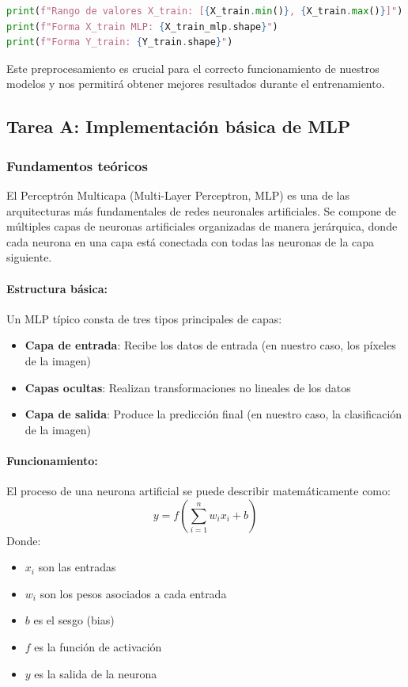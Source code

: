 \documentclass[11pt,a4paper]{article}
\begin{document}
\begin{lstlisting}[language=Python]
print(f"Rango de valores X_train: [{X_train.min()}, {X_train.max()}]")
print(f"Forma X_train MLP: {X_train_mlp.shape}")
print(f"Forma Y_train: {Y_train.shape}")
\end{lstlisting}

Este preprocesamiento es crucial para el correcto funcionamiento de nuestros modelos y nos permitirá obtener mejores resultados durante el entrenamiento.

\subsection{Tarea A: Implementación básica de MLP}

\subsubsection{Fundamentos teóricos}

El Perceptrón Multicapa (Multi-Layer Perceptron, MLP) es una de las arquitecturas más fundamentales de redes neuronales artificiales. Se compone de múltiples capas de neuronas artificiales organizadas de manera jerárquica, donde cada neurona en una capa está conectada con todas las neuronas de la capa siguiente.

\paragraph{Estructura básica:}
Un MLP típico consta de tres tipos principales de capas:
\begin{itemize}
    \item \textbf{Capa de entrada}: Recibe los datos de entrada (en nuestro caso, los píxeles de la imagen)
    \item \textbf{Capas ocultas}: Realizan transformaciones no lineales de los datos
    \item \textbf{Capa de salida}: Produce la predicción final (en nuestro caso, la clasificación de la imagen)
\end{itemize}

\paragraph{Funcionamiento:}
El proceso de una neurona artificial se puede describir matemáticamente como:
\[ y = f(\sum_{i=1}^{n} w_i x_i + b) \]
Donde:
\begin{itemize}
    \item $x_i$ son las entradas
    \item $w_i$ son los pesos asociados a cada entrada
    \item $b$ es el sesgo (bias)
    \item $f$ es la función de activación
    \item $y$ es la salida de la neurona
\end{itemize}
\end{document}
